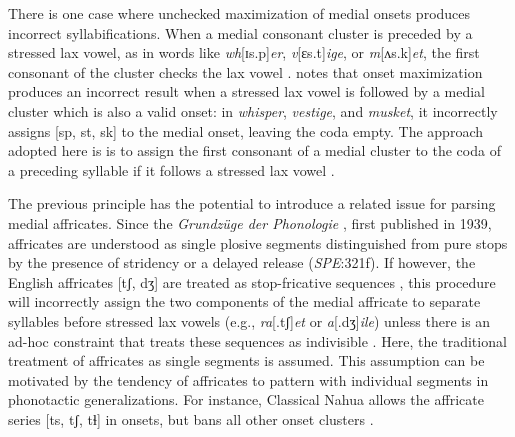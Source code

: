 There is one case where unchecked maximization of medial onsets produces incorrect syllabifications. When a medial consonant cluster is preceded by a stressed lax vowel, as in words like \emph{wh}[ɪs.p]\emph{er}, \emph{v}[ɛs.t]\emph{ige}, or \emph{m}[ʌs.k]\emph{et}, the first consonant of the cluster checks the lax vowel \citep[e.g.,][3]{Hammond1997}. \citet[][55]{Harris1994} notes that onset maximization produces an incorrect result when a stressed lax vowel is followed by a medial cluster which is also a valid onset: in \emph{whisper}, \emph{vestige}, and \emph{musket}, it incorrectly assigns [sp, st, sk] to the medial onset, leaving the coda empty. The approach adopted here is is to assign the first consonant of a medial cluster to the coda of a preceding syllable if it follows a stressed lax vowel \citep[cf.][48]{Pulgram1970}.

The previous principle has the potential to introduce a related issue for parsing medial affricates. Since the \emph{Grundzüge der Phonologie} \citep{Trubetzkoy1958}, first published in 1939, affricates are understood as single plosive segments distinguished from pure stops by the presence of stridency \citep[24]{Jakobson1961} or a delayed release (\emph{SPE}:321f). If however, the English affricates [tʃ, dʒ] are treated as stop-fricative sequences \citep[e.g.,][]{Hualde1988,Lombardi1990}, this procedure will incorrectly assign the two components of the medial affricate to separate syllables before stressed lax vowels (e.g., \emph{ra}[.tʃ]\emph{et} or \emph{a}[.dʒ]\emph{ile}) unless there is an ad-hoc constraint that treats these sequences as indivisible \citep[e.g.,][]{Wells1990}. Here, the traditional treatment of affricates as single segments is assumed. This assumption can be motivated by the tendency of affricates to pattern with individual segments in phonotactic generalizations. For instance, Classical Nahua allows the affricate series [ts, tʃ, tɬ] in onsets, but bans all other onset clusters \citep[9]{Launey2011}.%


